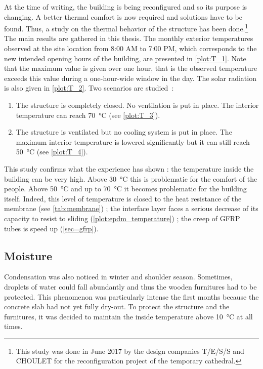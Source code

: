 At the time of writing, the building is being reconfigured and so its purpose is changing. A better thermal comfort is now required and solutions have to be found. Thus, a study on the thermal behavior of the structure has been done.\footnote{This study was done in June 2017 by the design companies T/E/S/S and CHOULET for the reconfiguration project of the temporary cathedral.} The main results are gathered in this thesis. The monthly exterior temperatures observed at the site location from 8:00 AM to 7:00 PM, which corresponds to the new intended opening hours of the building, are presented in \cref{plot:T_1}. Note that the maximum value is given over one hour, that is the observed temperature exceeds this value during a one-hour-wide window in the day. The solar radiation is also given in \cref{plot:T_2}. Two scenarios are studied~:
\begin{enumerate}
\item The structure is completely closed. No ventilation is put in place. The interior temperature can reach \SI{70}{\celsius} (see \cref{plot:T_3}).
\item The structure is ventilated but no cooling system is put in place. The maximum interior temperature is lowered significantly but it can still reach \SI{50}{\celsius} (see \cref{plot:T_4}).
\end{enumerate}

This study confirms what the experience has shown : the temperature inside the building can be very high. Above \SI{30}{\celsius} this is problematic for the comfort of the people. Above \SI{50}{\celsius} and up to \SI{70}{\celsius} it becomes problematic for the building itself. Indeed, this level of temperature is closed to the heat resistance of the membrane (see \cref{tab:membrane}) ; the interface layer faces a serious decrease of its capacity to resist to sliding (\cref{plot:epdm_temperature}) ; the creep of GFRP tubes is speed up (\cref{sec=gfrp}).

\subsection{Moisture}
Condensation was also noticed in winter and shoulder season. Sometimes, droplets of water could fall abundantly and thus the wooden furnitures had to be protected. This phenomenon was particularly intense the first months because the concrete slab had not yet fully dry-out. To protect the structure and the furnitures, it was decided to maintain the inside temperature above \SI{10}{\celsius} at all times.

